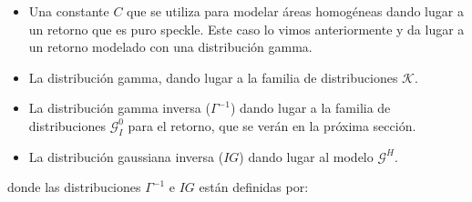 \begin{itemize}
	\item Una constante $C$ que se utiliza para modelar áreas homogéneas dando lugar a un retorno que es puro speckle. Este caso lo vimos anteriormente y da lugar a un retorno modelado con una distribución gamma.
	\item La distribución gamma, dando lugar a la familia de distribuciones $\mathcal{K}$. 
	\item La distribución gamma inversa ($\Gamma^{-1}$) dando lugar a la familia de distribuciones $\mathcal{G}_I^0$ para el retorno, que se verán en la próxima sección.
	\item La distribución gaussiana inversa ($IG$) dando lugar al modelo $\mathcal{G}^H$.
\end{itemize}

donde las distribuciones $\Gamma^{-1}$ e  $IG$ están definidas por:

